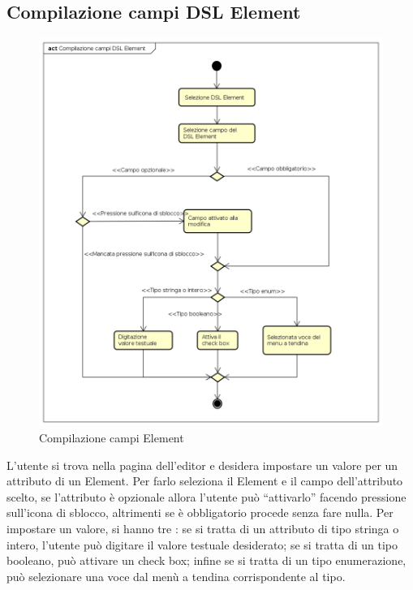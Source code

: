     \subsection{Compilazione campi DSL Element}
    \begin{figure}[H]
      \centering
      \includegraphics[width=1.1\textwidth]{res/img/compilazioneCampi.png}
      \caption{Compilazione campi  Element}
      \label{fig:diagram_model}
    \end{figure}
    L'utente si trova nella pagina dell'editor e desidera impostare un valore per un attributo di un  Element. Per farlo seleziona il  Element e il campo dell'attributo scelto, se l'attributo è opzionale allora l'utente può ``attivarlo'' facendo pressione sull'icona di sblocco, altrimenti se è obbligatorio procede senza fare nulla. Per impostare un valore, si hanno tre : se si tratta di un attributo di tipo stringa o intero, l'utente può digitare il valore testuale desiderato; se si tratta di un tipo booleano, può attivare un check box; infine se si tratta di un tipo enumerazione, può selezionare una voce dal menù a tendina corrispondente al tipo.
